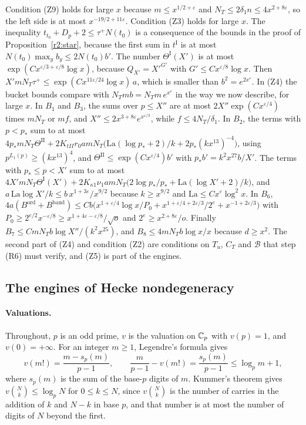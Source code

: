 Condition (Z9) holds for large $x$ because $m\le x^{1/2+\varepsilon}$ and $N_T\le2\delta_1n\le4x^{2+8\varepsilon}$, so the left side is at most $x^{-19/2+11\varepsilon}$. Condition (Z3) holds for large $x$. The inequality $t_{t_0}+D_p+2\le\tau^+N(t_0)$ is a consequence of the bounds in the proof of Proposition~\ref{r2:star}, because the first sum in $t^{\mathrm I}$ is at most $N(t_0)\max_yb_y\le2N(t_0)b'$. The number $\Theta^{\mathrm I}(X')$ is at most $\exp(Cx^{\varepsilon/3+\varepsilon/8}\log x)$, because $Q_{X'}=X'^{G'}$ with $G'\le Cx^{\varepsilon/8}\log x$. Then $X'mN_T\tau^+\le\exp(Cx^{11\varepsilon/24}\log x)\,a$, which is smaller than $b^2=e^{2x^\varepsilon}$. In (Z4) the bucket bounds compare with $N_Tmb=N_Tm\,e^{x^\varepsilon}$ in the way we now describe, for large $x$. In $B_1$ and $B_3$, the sums over $p\le X''$ are at most $2X''\exp(Cx^{\varepsilon/4})$ times $mN_T$ or $mf$, and $X''\le2x^{3+8\varepsilon}e^{x^{\varepsilon/3}}$, while $f\le4N_T/\delta_1$. In $B_2$, the terms with $p<p_*$ sum to at most $4p_*mN_T\Theta^{\mathrm{II}}+2K_{tII}r_0amN_T\big(\mathrm{La}(\log p_*+2)/k+2p_*(kx^{13})^{-4}\big)$, using $p^{L_1(p)}\ge(kx^{13})^4$, and $\Theta^{\mathrm{II}}\le\exp(Cx^{\varepsilon/4})b'$ with $p_*b'=k^2x^{27}b/X'$. The terms with $p_*\le p<X'$ sum to at most $4X'mN_T\Theta^{\mathrm I}(X')+2K_{\kappa1}\nu_1amN_T\big(2\log p_*/p_*+\mathrm{La}(\log X'+2)/k\big)$, and $a\,\mathrm{La}\log X'/k\le b\,x^{1+3\varepsilon}/x^{9/2}$ because $k\ge x^{9/2}$ and $\mathrm{La}\le Cx^{\varepsilon}\log^2x$. In $B_6$, $4a(B^{\mathrm{ord}}+B^{\mathrm{band}})\le Cb\big(x^{1+\varepsilon/4}\log x/P_0+x^{1+\varepsilon/4+2\varepsilon/3}/2^e+x^{-1+2\varepsilon/3}\big)$ with $P_0\ge2^{e/2}x^{-\varepsilon/8}\ge x^{1+4\varepsilon-\varepsilon/8}/\sqrt o$ and $2^e\ge x^{2+8\varepsilon}/o$. Finally $B_7\le CmN_Tb\log X''/(k^2x^{25})$, and $B_8\le4mN_Tb\log x/x$ because $d\ge x^2$. The second part of (Z4) and condition (Z2) are conditions on $T_u$, $C_T$ and $\mathcal B$ that step (R6) must verify, and (Z5) is part of the engines.


\subsection{The engines of Hecke nondegeneracy}\label{w1:sec:scope}

\paragraph{Valuations.} Throughout, $p$ is an odd prime, $v$ is the valuation on $\mathbb C_p$ with $v(p)=1$, and $v(0)=+\infty$. For an integer $m\ge1$, Legendre's formula gives
\begin{equation}\label{w1:eq:legendre}
v(m!)=\frac{m-s_p(m)}{p-1},\qquad \frac{m}{p-1}-v(m!)=\frac{s_p(m)}{p-1}\le\log_pm+1,
\end{equation}
where $s_p(m)$ is the sum of the base-$p$ digits of $m$. Kummer's theorem gives $v\binom Nk\le\log_pN$ for $0\le k\le N$, since $v\binom Nk$ is the number of carries in the addition of $k$ and $N-k$ in base $p$, and that number is at most the number of digits of $N$ beyond the first.

